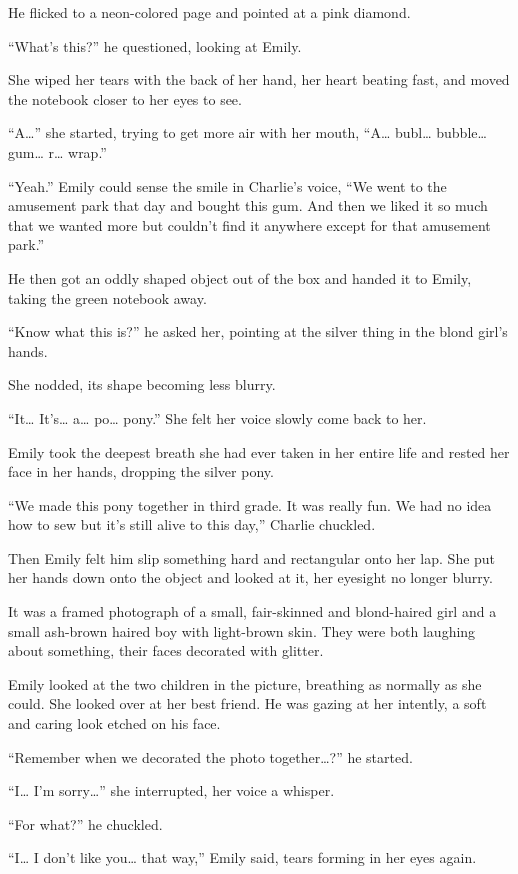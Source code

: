 He flicked to a neon-colored page and pointed at a pink diamond.

“What's this?” he questioned, looking at Emily.

She wiped her tears with the back of her hand, her heart beating fast, and moved the notebook closer to her eyes to see.

“A…” she started, trying to get more air with her mouth, “A… bubl… bubble… gum… r… wrap.”

“Yeah.” Emily could sense the smile in Charlie's voice, “We went to the amusement park that day and bought this gum. And then we liked it so much that we wanted more but couldn't find it anywhere except for that amusement park.”

He then got an oddly shaped object out of the box and handed it to Emily, taking the green notebook away.

“Know what this is?” he asked her, pointing at the silver thing in the blond girl's hands.

She nodded, its shape becoming less blurry.

“It… It's… a… po… pony.” She felt her voice slowly come back to her.

Emily took the deepest breath she had ever taken in her entire life and rested her face in her hands, dropping the silver pony.

“We made this pony together in third grade. It was really fun. We had no idea how to sew but it's still alive to this day,” Charlie chuckled.

Then Emily felt him slip something hard and rectangular onto her lap. She put her hands down onto the object and looked at it, her eyesight no longer blurry.

It was a framed photograph of a small, fair-skinned and blond-haired girl and a small ash-brown haired boy with light-brown skin. They were both laughing about something, their faces decorated with glitter.

Emily looked at the two children in the picture, breathing as normally as she could. She looked over at her best friend. He was gazing at her intently, a soft and caring look etched on his face.

“Remember when we decorated the photo together…?” he started.

“I… I'm sorry…” she interrupted, her voice a whisper.

“For what?” he chuckled.

“I… I don't like you… that way,” Emily said, tears forming in her eyes again.

